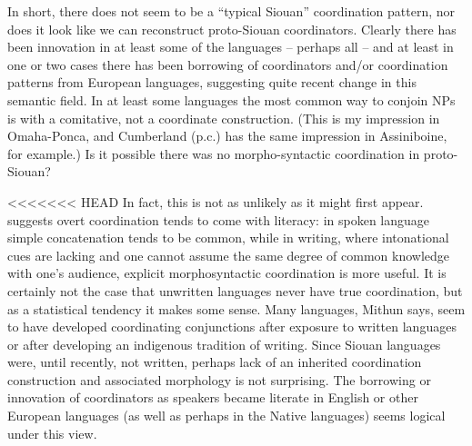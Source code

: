 \documentclass[output=paper]{LSP/langsci}
\begin{document}
In short, there does not seem to be a ``typical Siouan'' coordination pattern, nor does it look like we can reconstruct proto-Siouan coordinators. Clearly there has been innovation in at least some of the languages -- perhaps all -- and at least in one or two cases there has been borrowing of coordinators and/or coordination patterns from European languages, suggesting quite recent change in this semantic field. In at least some languages the most common way to conjoin NPs is with a comitative, not a coordinate construction. (This is my impression in Omaha-Ponca, and Cumberland (p.c.) has the same impression in Assiniboine, for example.) Is it possible there was no morpho-syntactic coordination in proto-Siouan?

<<<<<<< HEAD
In fact, this is not as unlikely as it might first appear. \citet{Mithun1988} suggests overt coordination tends to come with literacy: in spoken language simple concatenation tends to be common, while in writing, where intonational cues are lacking and one cannot assume the same degree of common knowledge with one's audience, explicit morphosyntactic coordination is more useful. It is certainly not the case that unwritten languages never have true coordination, but as a statistical tendency it makes some sense. Many languages, Mithun says, seem to have developed coordinating conjunctions after exposure to written languages or after developing an indigenous tradition of writing. Since Siouan languages were, until recently, not written, perhaps lack of an inherited coordination construction and associated morphology is not surprising. The borrowing or innovation of coordinators as speakers became literate in English or other European languages (as well as perhaps in the Native languages) seems logical under this view.
\end{document}
